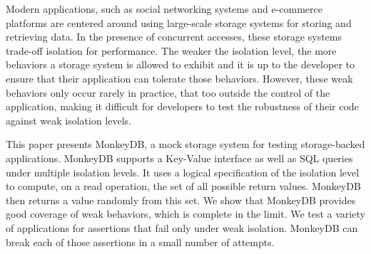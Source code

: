 
Modern applications, such as social networking systems and e-commerce platforms
are centered around using large-scale storage systems for storing and retrieving
data. In the presence of concurrent accesses, these storage systems trade-off isolation
for performance. The weaker the isolation level, the more behaviors a storage
system is allowed to exhibit and it is up to the developer to ensure that their
application can tolerate those behaviors. However, these weak behaviors only
occur rarely in practice, that too outside the control of the application, 
making it difficult for developers to test the robustness of their 
code against weak isolation levels. 

This paper presents MonkeyDB, a mock storage system for testing storage-backed
applications. MonkeyDB supports a Key-Value interface as well as SQL queries
under multiple isolation levels. It uses a logical specification of the isolation
level to compute, on a read operation, the set of all possible return values.
MonkeyDB then returns a value randomly from this set. 
We show that MonkeyDB provides 
good coverage of weak behaviors, which is complete in the limit. We test a
variety of applications for assertions that fail only under weak isolation.
MonkeyDB can break each of those assertions in a small number of attempts. 
